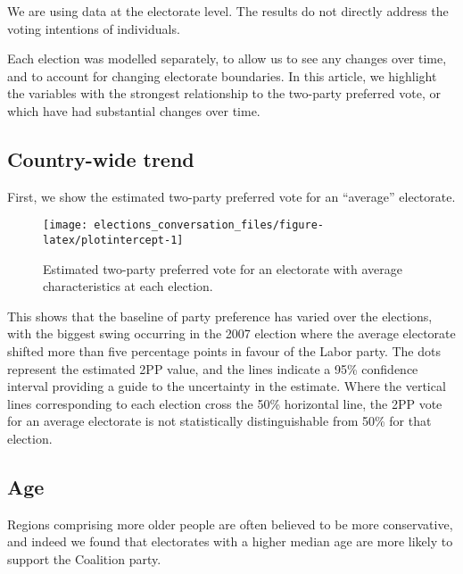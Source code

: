\documentclass[11pt,a4paper,]{article}
\begin{document}
We are using data at the electorate level. The results do not directly address the voting intentions of individuals.

Each election was modelled separately, to allow us to see any changes over time, and to account for changing electorate boundaries. In this article, we highlight the variables with the strongest relationship to the two-party preferred vote, or which have had substantial changes over time.

\hypertarget{country-wide-trend}{%
\subsection*{Country-wide trend}\label{country-wide-trend}}

First, we show the estimated two-party preferred vote for an ``average'' electorate.

\begin{figure}[H]

{\centering \texttt{[image: elections\_conversation\_files/figure-latex/plotintercept-1]} 

}

\caption{Estimated two-party preferred vote for an electorate with average characteristics at each election.}\label{fig:plotintercept}
\end{figure}

This shows that the baseline of party preference has varied over the elections, with the biggest swing occurring in the 2007 election where the average electorate shifted more than five percentage points in favour of the Labor party. The dots represent the estimated 2PP value, and the lines indicate a 95\% confidence interval providing a guide to the uncertainty in the estimate. Where the vertical lines corresponding to each election cross the 50\% horizontal line, the 2PP vote for an average electorate is not statistically distinguishable from 50\% for that election.

\hypertarget{age}{%
\subsection*{Age}\label{age}}

Regions comprising more older people are often believed to be more conservative, and indeed we found that electorates with a higher median age are more likely to support the Coalition party.
\end{document}
